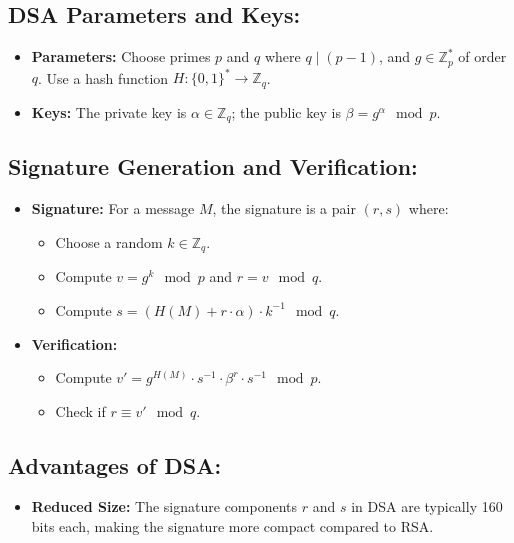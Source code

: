 \documentclass[12pt]{article}
\begin{document}
\subsection*{DSA Parameters and Keys:}
\begin{itemize}
    \item \textbf{Parameters:} Choose primes \( p \) and \( q \) where \( q \mid (p-1) \), and \( g \in \mathbb{Z}_p^* \) of order \( q \). Use a hash function \( H: \{0,1\}^* \rightarrow \mathbb{Z}_q \).
    \item \textbf{Keys:} The private key is \( \alpha \in \mathbb{Z}_q \); the public key is \( \beta = g^\alpha \mod p \).
\end{itemize}

\subsection*{Signature Generation and Verification:}
\begin{itemize}
    \item \textbf{Signature:} For a message \( M \), the signature is a pair \( (r, s) \) where:
    \begin{itemize}
        \item Choose a random \( k \in \mathbb{Z}_q \).
        \item Compute \( v = g^k \mod p \) and \( r = v \mod q \).
        \item Compute \( s = (H(M) + r \cdot \alpha) \cdot k^{-1} \mod q \).
    \end{itemize}
    \item \textbf{Verification:} 
    \begin{itemize}
        \item Compute \( v' = g^{H(M)} \cdot s^{-1} \cdot \beta^{r} \cdot s^{-1} \mod p \).
        \item Check if \( r \equiv v' \mod q \).
    \end{itemize}
\end{itemize}

\subsection*{Advantages of DSA:}
\begin{itemize}
    \item \textbf{Reduced Size:} The signature components \( r \) and \( s \) in DSA are typically 160 bits each, making the signature more compact compared to RSA.
\end{itemize}
\end{document}
